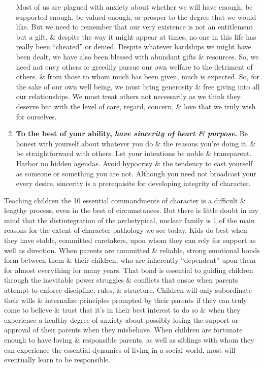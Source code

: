 \documentclass{article}
\numberwithin{equation}{section}
\begin{document}
\begin{enumerate}
	Most of us are plagued with anxiety about whether we will have enough, be supported enough, be valued enough, or prosper to the degree that we would like. But we need to remember that our very existence is not an entitlement but a gift. \& despite the way it might appear at times, no one in this life has really been ``cheated'' or denied. Despite whatever hardships we might have been dealt, we have also been blessed with abundant gifts \& resources. So, we need not envy others or greedily pursue our own welfare to the detriment of others. \& from those to whom much has been given, much is expected. So, for the sake of our own well being, we must bring generosity \& free giving into all our relationships. We must treat others not necessarily as we think they deserve but with the level of care, regard, concern, \& love that we truly wish for ourselves.
	\item \textbf{To the best of your ability, \textit{have sincerity of heart \& purpose}.} Be honest with yourself about whatever you do \& the reasons you're doing it. \& be straightforward with others. Let your intentions be noble \& transparent. Harbor no hidden agendas. Avoid hypocrisy \& the tendency to cast yourself as someone or something you are not. Although you need not broadcast your every desire, sincerity is a prerequisite for developing integrity of character.
\end{enumerate}
Teaching children the 10 essential commandments of character is a difficult \& lengthy process, even in the best of circumstances. But there is little doubt in my mind that the distintegration of the archetypical, nuclear family is 1 of the main reasons for the extent of character pathology we see today. Kids do best when they have stable, committed caretakers, upon whom they can rely for support as well as direction. When parents are committed \& reliable, strong emotional bonds form between them \& their children, who are inherently ``dependent'' upon them for almost everything for many years. That bond is essential to guiding children through the inevitable power struggles \& conflicts that ensue when parents attempt to enforce discipline, rules, \& structure. Children will only subordinate their wills \& internalize principles prompted by their parents if they can truly come to believe \& trust that it's in their best interest to do so \& when they experience a healthy degree of anxiety about possibly losing the support or approval of their parents when they misbehave. When children are fortunate enough to have loving \& responsible parents, as well as siblings with whom they can experience the essential dynamics of living in a social world, most will eventually learn to be responsible.
\end{document}
